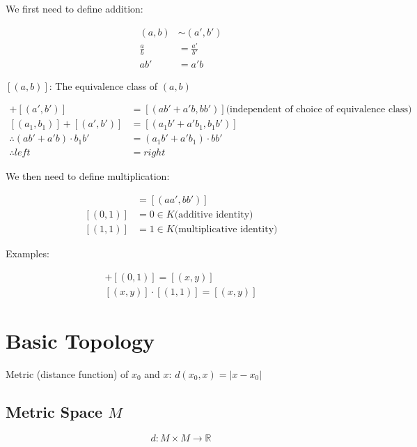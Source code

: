 \documentclass{article}
\begin{document}
    We first need to define addition:
    
    \begin{align*}
        (a, b) &\sim (a', b') \\
        \frac{a}{b} &= \frac{a'}{b'} \\
        ab' &= a'b
    \end{align*}
    
    $[(a, b)]$: The equivalence class of $(a, b)$
    
    \begin{align*}
        [(a, b)] + [(a', b')] &= [(ab' + a'b, bb')]
        \text{(independent of choice of equivalence class)} \\
        [(a_{1}, b_{1})] + [(a', b')] &= [(a_{1}b' + a'b_{1}, b_{1}b')] \\
        \therefore (ab' + a'b) \cdot b_{1}b' &= (a_{1}b' + a'b_{1}) \cdot bb' \\
        \therefore left &= right
    \end{align*}
    
    We then need to define multiplication:
    
    \begin{align*}
        [(a, b)] [(a', b')] &= [(aa', bb')] \\
        [(0, 1)] &= 0 \in K \text{(additive identity)} \\
        [(1, 1)] &= 1 \in K \text{(multiplicative identity)}
    \end{align*}
    
    Examples:
    
    \begin{align*}
        [(x, y)] + [(0, 1)] = [(x, y)] \\
        [(x, y)] \cdot [(1, 1)] = [(x, y)]
    \end{align*}

    \section{Basic Topology}

        Metric (distance function) of $x_{0}$ and $x$: $d(x_{0}, x) = \lvert x - x_{0} \rvert$

    \subsection{Metric Space $M$}

        \begin{displaymath}
        d \colon M \times M \to \mathbb{R}
        \end{displaymath}
\end{document}
